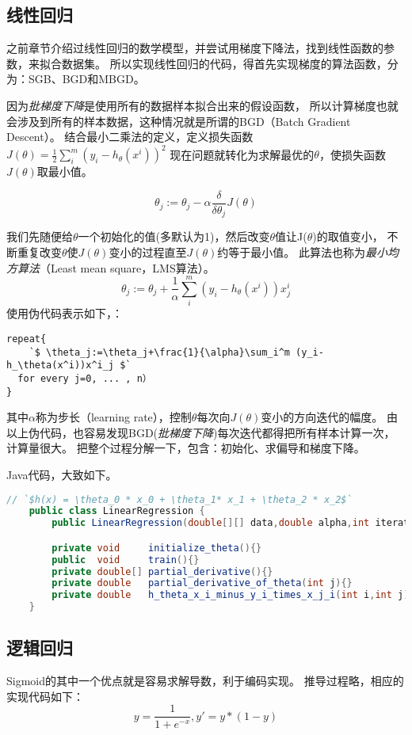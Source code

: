 \subsection{线性回归}
之前章节介绍过线性回归的数学模型，并尝试用梯度下降法，找到线性函数的参数，来拟合数据集。
所以实现线性回归的代码，得首先实现梯度的算法函数，分为：SGB、BGD和MBGD。

因为\emph{批梯度下降}是使用所有的数据样本拟合出来的假设函数，
所以计算梯度也就会涉及到所有的样本数据，这种情况就是所谓的BGD（Batch Gradient Descent）。
结合最小二乘法的定义，定义损失函数
$J(\theta)=\frac{1}{2}\sum_i^m(y_i-h_\theta(x^i))^2$
现在问题就转化为求解最优的$\theta$，使损失函数$J(\theta)$取最小值。

$$ \theta_j:=\theta_j-\alpha\frac{\delta}{\delta\theta_j}J(\theta) $$

我们先随便给$\theta$一个初始化的值(多默认为1)，然后改变$\theta$值让J($\theta$)的取值变小，
不断重复改变$\theta$使$J(\theta)$变小的过程直至$J(\theta)$约等于最小值。
此算法也称为\emph{最小均方算法}（Least mean square，LMS算法）。
$$ \theta_j:=\theta_j+\frac{1}{\alpha}\sum_i^m (y_i-h_\theta(x^i))x^i_j $$
\noindent
使用伪代码表示如下，：
\begin{lstlisting}[escapeinside=``]
repeat{　　　　
	`$ \theta_j:=\theta_j+\frac{1}{\alpha}\sum_i^m (y_i-h_\theta(x^i))x^i_j $`
  for every j=0, ... , n）
}
\end{lstlisting}

\noindent
其中$\alpha$称为步长（learning rate），控制$\theta$每次向$J(\theta)$变小的方向迭代的幅度。
由以上伪代码，也容易发现BGD(\emph{批梯度下降})每次迭代都得把所有样本计算一次，计算量很大。
把整个过程分解一下，包含：初始化、求偏导和梯度下降。
\vspace{0.3cm}

\noindent
Java代码，大致如下。
\begin{lstlisting}[language=Java, escapeinside=``]
	// `$h(x) = \theta_0 * x_0 + \theta_1* x_1 + \theta_2 * x_2$`
	public class LinearRegression {
		public LinearRegression(double[][] data,double alpha,int iteration){}

		private void     initialize_theta(){}
		public  void     train(){}
		private double[] partial_derivative(){}
		private double   partial_derivative_of_theta(int j){}
		private double   h_theta_x_i_minus_y_i_times_x_j_i(int i,int j){}
	}
\end{lstlisting}



\subsection{逻辑回归}
Sigmoid的其中一个优点就是容易求解导数，利于编码实现。
推导过程略，相应的实现代码如下：
$$ y = \frac{1}{1+e^{-x}}, y' = y*(1-y) $$

